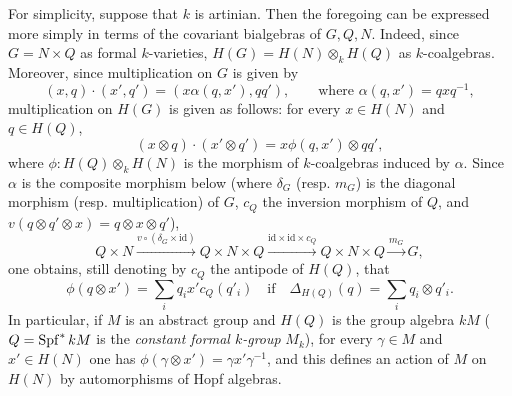 \footnotemark[92]For simplicity, suppose that $k$ is artinian. Then the foregoing can be expressed more simply in terms of the covariant bialgebras of $G,Q,N$. Indeed, since $G=N\times Q$ as formal $k$-varieties, $H(G)=H(N)\otimes_k H(Q)$ as $k$-coalgebras. Moreover, since multiplication on $G$ is given by
\[
(x,q)\cdot(x',q')=(x\alpha(q,x'),qq'),\qquad\text{where }\alpha(q,x')=qxq^{-1},
\]
multiplication on $H(G)$ is given as follows: for every $x\in H(N)$ and $q\in H(Q)$,
\[
(x\otimes q)\cdot(x'\otimes q')=x\phi(q,x')\otimes qq',
\]
where $\phi:H(Q)\otimes_k H(N)$ is the morphism of $k$-coalgebras induced by $\alpha$.
Since $\alpha$ is the composite morphism below (where $\delta_G$ (resp. $m_G$) is the diagonal morphism (resp. multiplication) of $G$, $c_Q$ the inversion morphism of $Q$, and $v(q\otimes q'\otimes x)=q\otimes x\otimes q'$),
\[
Q\times N\xrightarrow{v\circ(\delta_G\times\mathrm{id})}Q\times N\times Q
\xrightarrow{\mathrm{id}\times\mathrm{id}\times c_Q}Q\times N\times Q\xrightarrow{m_G}G,
\]
one obtains, still denoting by $c_Q$ the antipode of $H(Q)$, that
\begin{equation}\tag{$\star$}
\phi(q\otimes x')=\sum_i q_ix'c_Q(q'_i)\quad\text{if}\quad\Delta_{H(Q)}(q)=\sum_i q_i\otimes q'_i.
\end{equation}
In particular, if $M$ is an abstract group and $H(Q)$ is the group algebra $kM$ (\ie $Q=\operatorname{Spf}^*kM$ is the \emph{constant formal $k$-group} $M_k$), for every $\gamma\in M$ and $x'\in H(N)$ one has $\phi(\gamma\otimes x')=\gamma x'\gamma^{-1}$, and this defines an action of $M$ on $H(N)$ by automorphisms of Hopf algebras.

